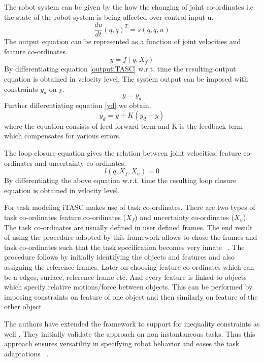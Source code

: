The robot system can be given by the how the changing of joint co-ordinates i.e the state of the robot system is being affected over control input u.  
\begin{equation}
\frac{du}{dt}(q,\dot{q})^{T} = s(q,\dot{q},u)
\end{equation}
The output equation can be represented as a function of joint velocities and feature co-ordinates.
\begin{equation}
y = f(q,X_{f})
\label{outputiTASC}
\end{equation}
By differentiating equation \ref{outputiTASC} w.r.t. time the resulting output equation is obtained in velocity level.
The system output can be imposed with constraints $y_{d}$ on y.
\begin{equation}
y = y_{d}
\label{yd}
\end{equation}
Further differentiating equation \ref{yd} we obtain,
\begin{equation}
\dot{y_{d}} = \dot{y} + K(y_{d} - y)
\end{equation}
where the equation consists of feed forward term and K is the feedback term which compensates for various errors.


The loop closure equation gives the relation between joint velocities, feature co-ordinates and uncertainty co-ordinates.
\begin{equation}
l(q,X_{f},X_{u}) = 0
\end{equation}
By differentiating the above equation w.r.t. time the resulting loop closure equation is obtained in velocity level.



For task modeling iTASC makes use of task co-ordinates. There are two types of task co-ordinates feature co-ordinates ($X_{f}$) and uncertainty co-ordinates ($X_{u}$). The task co-ordinates are usually defined in user defined frames. The end result of using the procedure adopted by this framework allows to chose the frames and task co-ordinates such that the task specification becomes very innate ~\cite{itasc}. The procedure follows by initially identifying the objects and features and also assigning the reference frames. Later on choosing feature co-ordinates which can be a edges, surface, reference frame etc. And every feature is linked to objects which specify relative motions/force between objects. This can be performed by imposing constraints on feature of one object and then similarly on feature of the other object \cite{smits2008itasc}\cite{itasc}.


The authors have extended the framework to support for inequality constraints as well \cite{decre2009extending}\cite{decre2013extending}. They initially validate the approach on non instantaneous tasks. Thus this approach ensures versatility in specifying robot behavior and eases the task adaptations ~\cite{decre2013extending}. 


